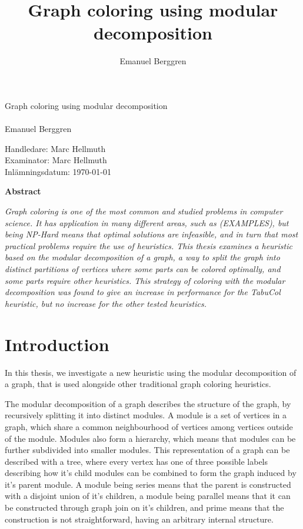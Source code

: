\documentclass[a4paper]{article}
\author{Emanuel Berggren}
\title{Graph coloring using modular decomposition}
\newcommand{\Framsida}{\AddToShipoutPicture*{\put(0,0){\texttt{[image: kandidatfram.pdf]}}}}
\begin{document}
\Framsida 
\vspace*{4cm}
\Huge{Graph coloring using modular decomposition}\\\\ %
\Large{Emanuel Berggren} %

\vspace*{12cm}
\Large{Handledare: Marc Hellmuth} \\ 
\Large{Examinator: Marc Hellmuth} \\ 
\Large{Inlämningsdatum: \today}\\

\begin{center}
	\textbf{Abstract}
\end{center}
\textit{
Graph coloring is one of the most common and studied problems in computer
science. It has application in many different areas, such as (EXAMPLES), but
being NP-Hard means that optimal solutions are infeasible, and in turn that most
practical problems require the use of heuristics. This thesis examines a
heuristic based on the modular decomposition of a graph, a way to split the graph
into distinct partitions of vertices where some parts can be colored optimally,
and some parts require other heuristics. This strategy of coloring with the
modular decomposition was found to give an increase in performance for the
TabuCol heuristic, but no increase for the other tested heuristics.
}




\tableofcontents

\section{Introduction}


In this thesis, we investigate a new heuristic using the modular decomposition of
a graph, that is used alongside other traditional graph coloring heuristics.

The modular decomposition of a graph describes the structure of the graph, by
recursively splitting it into distinct modules. A module is a set of vertices in
a graph, which share a common neighbourhood of vertices among vertices outside
of the module. Modules also form a hierarchy, which means that modules can be
further subdivided into smaller modules. This representation of a graph can be
described with a tree, where every vertex has one of three possible labels
describing how it's child modules can be combined to form the graph induced by
it's parent module. A module being series means that the parent is constructed
with a disjoint union of it's children, a module being parallel means that it
can be constructed through graph join on it's children, and prime means that the
construction is not straightforward, having an arbitrary internal structure.
\end{document}
